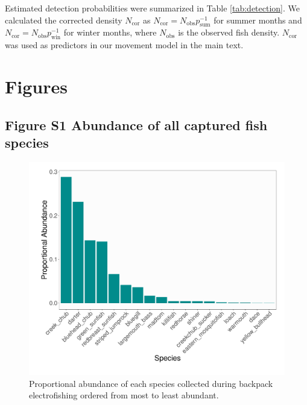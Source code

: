 \documentclass[11pt, class=article, crop=false]{standalone}
\begin{document}
Estimated detection probabilities were summarized in Table \ref{tab:detection}. We calculated the corrected density $N_{\text{cor}}$ as $N_{\text{cor}} = N_{\text{obs}}p_{\text{sum}}^{-1}$ for summer months and $N_{\text{cor}} = N_{\text{obs}}p_{\text{win}}^{-1}$ for winter months, where $N_{\text{obs}}$ is the observed fish density. $N_{\text{cor}}$ was used as predictors in our movement model in the main text.

\newpage

\section{Figures}

\subsection{Figure S1 Abundance of all captured fish species}

\begin{figure}
    \centering
    \includegraphics[width=0.9\linewidth]{output/fig_abundance.pdf}
    \caption{Proportional abundance of each species collected during backpack electrofishing ordered from most to least abundant.}
    \label{fig:fig_abundance}
\end{figure}

\newpage

\end{document}
